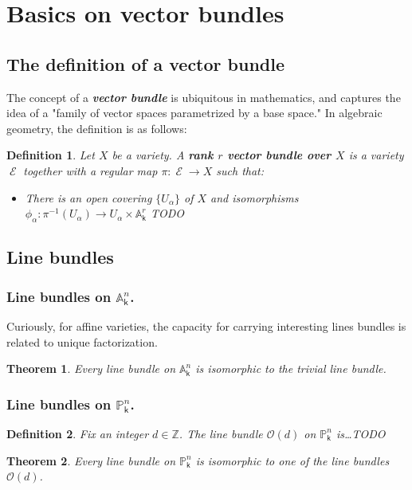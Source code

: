 \documentclass[11pt]{article}
\newcommand{\A}{\mathbb{A}}
\renewcommand{\P}{\mathbb{P}}
\renewcommand{\O}{\mathcal{O}}
\renewcommand{\Z}{\mathbb{Z}}
\renewcommand{\k}{\mathsf{k}}
\renewcommand{\to}{\longrightarrow}
\DeclareMathOperator{\E}{\mathcal{E}}
\newcommand{\A}{\mathbb A}
\renewcommand{\k}{\mathsf{k}}
\renewcommand{\P}{\mathbb P}
\renewcommand{\to}{{\longrightarrow}}
\newtheorem{theorem}{Theorem}[section]
\newtheorem{definition}{Definition}[section]
\begin{document}
\section{Basics on vector bundles}
\label{sec:org2fb6c44}
\subsection{The definition of a vector bundle}
\label{sec:org86d9171}
The concept of a \textbf{\emph{vector bundle}} is ubiquitous in mathematics, and captures the idea of a "family of vector spaces parametrized by a base space."  In algebraic geometry, the definition is as follows:
\begin{definition}
Let \(X\) be a variety.  A \textbf{\emph{rank \(r\) vector bundle over \(X\)}} is a variety \(\E\) together with a regular map \(\pi: \E \to X\) such that:
\begin{itemize}
\item There is an open covering \(\{U_{\alpha}\}\) of \(X\)  and isomorphisms \(\phi_{\alpha}: \pi^{-1}(U_{\alpha}) \to U_{\alpha}\times \A^r_{\k}\) TODO
\end{itemize}
\end{definition}
\subsection{Line bundles}
\label{sec:org256547f}
\subsubsection{Line bundles on \(\A^n_{\k}\).}
\label{sec:orgc9c3e10}
Curiously, for affine varieties, the capacity for carrying interesting lines bundles is related to unique factorization.
\begin{theorem}
Every line bundle on \(\A^{n}_{\k}\) is isomorphic to the trivial line bundle.
\end{theorem}
\subsubsection{Line bundles on \(\P^n_{\k}\).}
\label{sec:org42f55a9}

\begin{definition}
Fix an integer \(d \in \Z\). The line bundle \(\O(d)\) on \(\P^{n}_{\k}\) is\ldots{}TODO 
\end{definition}

\begin{theorem}
Every line bundle on \(\P^n_{\k}\) is isomorphic to one of the line bundles \(\O(d)\).
\end{theorem}
\end{document}
